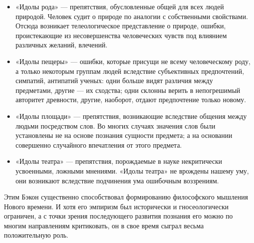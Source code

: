 \documentclass[12pt]{article}
\begin{document}
\begin{itemize}
  \item «Идолы рода» — препятствия, обусловленные общей для всех людей природой. Человек судит о природе по
аналогии с собственными свойствами. Отсюда возникает телеологическое представление о природе, ошибки,
проистекающие  из несовершенства   человеческих   чувств   под влиянием различных желаний, влечений.
\item «Идолы пещеры» — ошибки, которые присущи не всему человеческому роду, а только некоторым группам
людей вследствие субъективных предпочтений, симпатий, антипатий ученых: одни больше видят различия
между предметами, другие — их сходства; одни склонны верить в непогрешимый авторитет древности, другие,
наоборот, отдают предпочтение только новому.
\item «Идолы  площади» — препятствия, возникающие вследствие
общения между людьми посредством слов. Во многих случаях значения слов были установлены не на
основе познания сущности предмета; а на основании совершенно случайного впечатления от этого предмета.
\item «Идолы театра» — препятствия, порождаемые в науке некритически усвоенными, ложными мнениями. «Идолы
театра» не врождены нашему уму, они возникают вследствие подчинения ума ошибочным воззрениям.
\end{itemize}
Этим Бэкон существенно способствовал формированию философского мышления Нового времени. И хотя
его  эмпиризм  был  исторически  и  гносеологически  ограничен,  а  с  точки  зрения  последующего  развития
познания его можно по многим  направлениям критиковать, он в свое время сыграл весьма положительную
роль.
\end{document}
